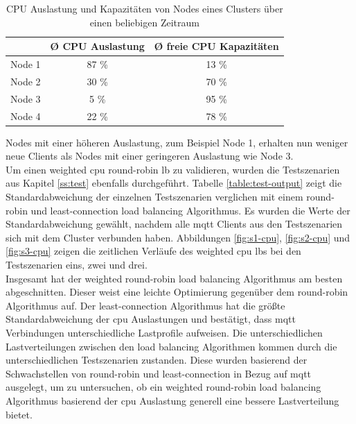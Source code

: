 \begin{table}[h]
\centering
\renewcommand{\arraystretch}{1.5}
\begin{tabular}{|l|c|c|}
    \hline
    & \textbf{Ø CPU Auslastung} & \textbf{Ø freie CPU Kapazitäten} \\
    \hline
    \hline
    Node 1 & 87 \% & 13 \% \\
    \hline
    Node 2 & 30 \% & 70 \% \\
    \hline
    Node 3 & 5 \% & 95 \% \\
    \hline
    Node 4 & 22 \% & 78 \% \\
    \hline
\end{tabular}
\caption{CPU Auslastung und Kapazitäten von Nodes eines Clusters über einen beliebigen Zeitraum}
\label{table:example-cluster-cpu}
\end{table}
Nodes mit einer höheren Auslastung, zum Beispiel Node 1, erhalten nun weniger neue Clients als Nodes mit einer geringeren Auslastung wie Node 3.
\\
Um einen weighted \ac{cpu} round-robin \acl{lb} zu validieren, wurden die Testszenarien aus Kapitel \ref{ss:test} ebenfalls durchgeführt.
Tabelle \ref{table:test-output} zeigt die Standardabweichung der einzelnen Testszenarien verglichen mit einem round-robin und least-connection load balancing Algorithmus.
Es wurden die Werte der Standardabweichung gewählt, nachdem alle \ac{mqtt} Clients aus den Testszenarien sich mit dem Cluster verbunden haben.
Abbildungen \ref{fig:s1-cpu}, \ref{fig:s2-cpu} und \ref{fig:s3-cpu} zeigen die zeitlichen Verläufe des weighted \ac{cpu} \aclp{lb} bei den Testszenarien eins, zwei und drei.
\\
Insgesamt hat der weighted round-robin load balancing Algorithmus am besten abgeschnitten. Dieser weist eine leichte Optimierung gegenüber dem round-robin Algorithmus auf. Der least-connection Algorithmus hat die grö{\ss}te Standardabweichung der \ac{cpu} Auslastungen und bestätigt, dass \ac{mqtt} Verbindungen unterschiedliche Lastprofile aufweisen.
Die unterschiedlichen Lastverteilungen zwischen den load balancing Algorithmen kommen durch die unterschiedlichen Testszenarien zustanden. Diese wurden basierend der Schwachstellen von round-robin und least-connection in Bezug auf \ac{mqtt} ausgelegt, um zu untersuchen, ob ein weighted round-robin load balancing Algorithmus basierend der \ac{cpu} Auslastung generell eine bessere Lastverteilung bietet.

